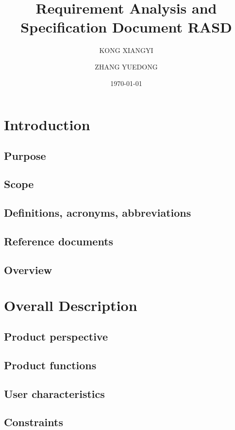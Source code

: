 \documentclass[a4paper,12pt]{book}
\begin{document}
 
	
\title{Requirement Analysis and Specification Document RASD}
\author{KONG XIANGYI\and ZHANG YUEDONG}
\date{\today}


\frontmatter
\maketitle


\tableofcontents

\mainmatter

\chapter{Introduction}
\section{Purpose}
\section{Scope}
\section{Definitions, acronyms, abbreviations}
\section{Reference documents}
\section{Overview}

\chapter{Overall Description}
\section{Product perspective}
\section{Product functions}
\section{User characteristics}
\section{Constraints}
\end{document}

